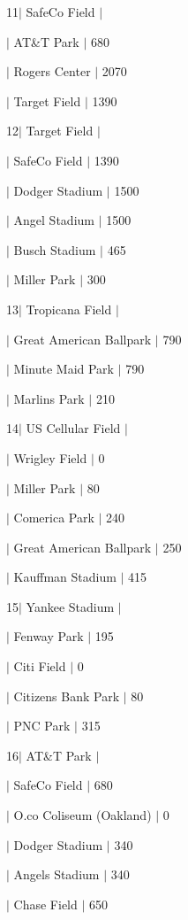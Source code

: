11$\vert$ Safe\+Co Field $\vert$
\begin{DoxyItemize}
\item $\vert$ AT\&T Park $\vert$ 680
\item $\vert$ Rogers Center $\vert$ 2070
\item $\vert$ Target Field $\vert$ 1390
\end{DoxyItemize}

12$\vert$ Target Field $\vert$
\begin{DoxyItemize}
\item $\vert$ Safe\+Co Field $\vert$ 1390
\item $\vert$ Dodger Stadium $\vert$ 1500
\item $\vert$ Angel Stadium $\vert$ 1500
\item $\vert$ Busch Stadium $\vert$ 465
\item $\vert$ Miller Park $\vert$ 300
\end{DoxyItemize}

13$\vert$ Tropicana Field $\vert$
\begin{DoxyItemize}
\item $\vert$ Great American Ballpark $\vert$ 790
\item $\vert$ Minute Maid Park $\vert$ 790
\item $\vert$ Marlins Park $\vert$ 210
\end{DoxyItemize}

14$\vert$ US Cellular Field $\vert$
\begin{DoxyItemize}
\item $\vert$ Wrigley Field $\vert$ 0
\item $\vert$ Miller Park $\vert$ 80
\item $\vert$ Comerica Park $\vert$ 240
\item $\vert$ Great American Ballpark $\vert$ 250
\item $\vert$ Kauffman Stadium $\vert$ 415
\end{DoxyItemize}

15$\vert$ Yankee Stadium $\vert$
\begin{DoxyItemize}
\item $\vert$ Fenway Park $\vert$ 195
\item $\vert$ Citi Field $\vert$ 0
\item $\vert$ Citizens Bank Park $\vert$ 80
\item $\vert$ P\+NC Park $\vert$ 315
\end{DoxyItemize}

16$\vert$ AT\&T Park $\vert$
\begin{DoxyItemize}
\item $\vert$ Safe\+Co Field $\vert$ 680
\item $\vert$ O.\+co Coliseum (Oakland) $\vert$ 0
\item $\vert$ Dodger Stadium $\vert$ 340
\item $\vert$ Angels Stadium $\vert$ 340
\item $\vert$ Chase Field $\vert$ 650
\end{DoxyItemize}

